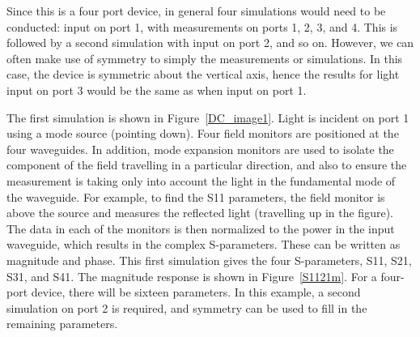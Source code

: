 \documentclass[journal]{spie}
\begin{document}
Since this is a four port device, in general four simulations would need to be conducted: input on port 1, with measurements on ports 1, 2, 3, and 4. This is followed by a second simulation with input on port 2, and so on.  However, we can often make use of symmetry to simply the measurements or simulations.  In this case, the device is symmetric about the vertical axis, hence the results for light input on port 3 would be the same as when input on port 1.

The first simulation is shown in Figure~\ref{DC_image1}.  Light is incident on port 1 using a mode source (pointing down).  Four field monitors are positioned at the four waveguides.  In addition, mode expansion monitors are used to isolate the component of the field travelling in a particular direction, and also to ensure the measurement is taking only into account the light in the fundamental mode of the waveguide. For example, to find the S11 parameters, the field monitor is above the source and measures the reflected light (travelling up in the figure).  The data in each of the monitors is then normalized to the power in the input waveguide, which results in the complex S-parameters. These can be written as magnitude and phase.  This first simulation gives the four S-parameters, S11, S21, S31, and S41.  The magnitude response is shown in Figure~\ref{S1121m}.  For a four-port device, there will be sixteen parameters.  In this example, a second simulation on port 2 is required, and symmetry can be used to fill in the remaining parameters.
\end{document}
